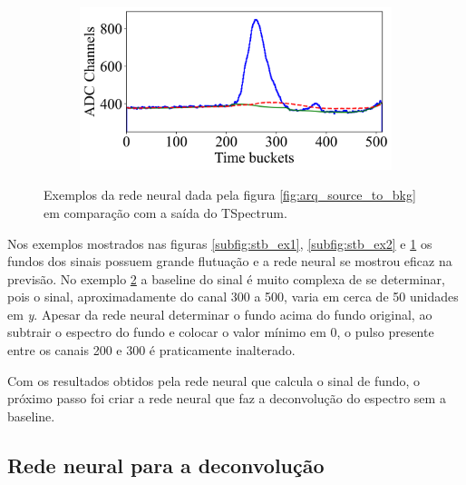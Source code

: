 \documentclass[a4paper,12pt,oneside]{book}
\begin{document}
\begin{figure}[H]
\begin{subfigure}[b]{0.47\textwidth}
        \caption{}
        \label{subfig:stb_ex3}
    \end{subfigure}%
    \hfill
    \begin{subfigure}[b]{0.46\textwidth}
        \centering
        \includegraphics[scale=0.43]{figs/stb_4.png}
        \caption{}
        \label{subfig:stb_ex4}
    \end{subfigure}
\caption{Exemplos da rede neural dada pela figura \ref{fig:arq_source_to_bkg} em comparação com a saída do TSpectrum.}
\label{fig:stb_examples}
\end{figure}

\par Nos exemplos mostrados nas figuras \ref{subfig:stb_ex1}, \ref{subfig:stb_ex2} e \ref{subfig:stb_ex3} os fundos dos sinais possuem grande flutuação e a rede neural se mostrou eficaz na previsão. No exemplo \ref{subfig:stb_ex4} a baseline do sinal é muito complexa de se determinar, pois o sinal, aproximadamente do canal 300 a 500, varia em cerca de 50 unidades em \textit{y}. Apesar da rede neural determinar o fundo acima do fundo original, ao subtrair o espectro do fundo e colocar o valor mínimo em 0, o pulso presente entre os canais 200 e 300 é praticamente inalterado.

\par Com os resultados obtidos pela rede neural que calcula o sinal de fundo, o próximo passo foi criar a rede neural que faz a deconvolução do espectro sem a baseline.

\subsection{Rede neural para a deconvolução}\label{subsec:pulso_ml_deconv}

\end{document}
